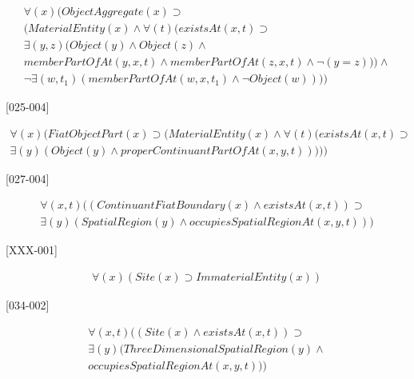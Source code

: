 \documentclass{article}
\begin{document}
\begin{flushright}
[020-002] 

\begin{equation}
\begin{split}
{\forall}(x)(ObjectAggregate(x) \supset \\
(MaterialEntity(x) \wedge {\forall}(t)(existsAt(x, t) \supset \\
{\exists}(y, z)(Object(y) \wedge Object(z) \wedge \\
memberPartOfAt(y, x, t) \wedge memberPartOfAt(z, x, t) \wedge {\neg}(y = z))) \wedge \\
{\neg}{\exists}(w, t_1)(memberPartOfAt(w, x, t_1) \wedge {\neg}Object(w))))
\end{split}
\end{equation}

[025-004] 

\begin{equation}
\begin{split}
{\forall}(x)(FiatObjectPart(x) \supset (MaterialEntity(x) \wedge {\forall}(t)(existsAt(x, t) \supset \\
{\exists}(y)(Object(y) \wedge properContinuantPartOfAt(x, y, t)))))
\end{split}
\end{equation}

[027-004] 

\begin{equation}
\begin{split}
{\forall}(x, t)((ContinuantFiatBoundary(x) \wedge existsAt(x, t)) \supset \\
{\exists}(y)(SpatialRegion(y) \wedge occupiesSpatialRegionAt(x, y, t)))
\end{split}
\end{equation}

[XXX-001] 

\begin{equation}
\begin{split}
{\forall}(x)(Site(x) \supset ImmaterialEntity(x))
\end{split}
\end{equation}

[034-002] 

\begin{equation}
\begin{split}
{\forall}(x, t)((Site(x) \wedge existsAt(x, t)) \supset \\
{\exists}(y)(ThreeDimensionalSpatialRegion(y) \wedge \\
occupiesSpatialRegionAt(x, y, t)))
\end{split}
\end{equation}


\end{flushright}
\end{document}

